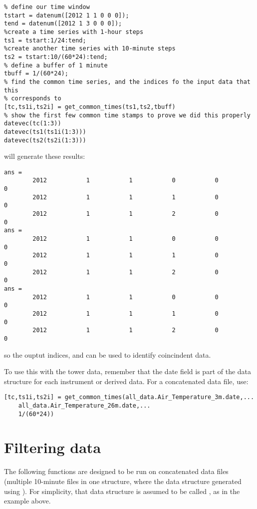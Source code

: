 \begin{lstlisting}
% define our time window
tstart = datenum([2012 1 1 0 0 0]);
tend = datenum([2012 1 3 0 0 0]);
%create a time series with 1-hour steps
ts1 = tstart:1/24:tend;
%create another time series with 10-minute steps
ts2 = tstart:10/(60*24):tend;
% define a buffer of 1 minute
tbuff = 1/(60*24);
% find the common time series, and the indices fo the input data that this
% corresponds to
[tc,ts1i,ts2i] = get_common_times(ts1,ts2,tbuff)
% show the first few common time stamps to prove we did this properly
datevec(tc(1:3))
datevec(ts1(ts1i(1:3)))
datevec(ts2(ts2i(1:3)))
\end{lstlisting}

\noindent will generate these results:
\begin{lstlisting}
ans =
        2012           1           1           0           0           0
        2012           1           1           1           0           0
        2012           1           1           2           0           0
ans =
        2012           1           1           0           0           0
        2012           1           1           1           0           0
        2012           1           1           2           0           0
ans =
        2012           1           1           0           0           0
        2012           1           1           1           0           0
        2012           1           1           2           0           0
\end{lstlisting}

\noindent so the ouptut indices,  and  can be used to identify coincindent  data.

To use this with the tower data, remember that the date field is part of the data structure for each instrument or derived data. For a concatenated data file, use:

\begin{lstlisting}
[tc,ts1i,ts2i] = get_common_times(all_data.Air_Temperature_3m.date,...
	all_data.Air_Temperature_26m.date,...
	1/(60*24))
\end{lstlisting}

\section{Filtering data}
The following functions are designed to be run on concatenated data files (multiple 10-minute files in one structure, where the data structure generated using ). For simplicity, that data structure is assumed to be called , as in the example above. 

